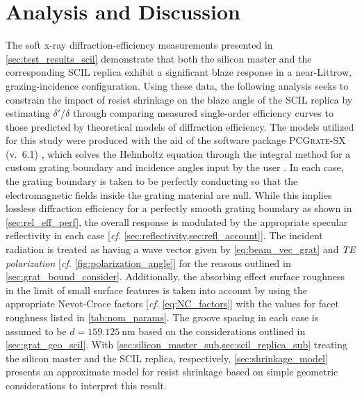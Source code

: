 \section{Analysis and Discussion}\label{sec:discussion_scil}
The soft x-ray diffraction-efficiency measurements presented in \cref{sec:test_results_scil} demonstrate that both the silicon master and the corresponding SCIL replica exhibit a significant blaze response in a near-Littrow, grazing-incidence configuration. 
Using these data, the following analysis seeks to constrain the impact of resist shrinkage on the blaze angle of the SCIL replica by estimating $\delta' / \delta$ through comparing measured single-order efficiency curves to those predicted by theoretical models of diffraction efficiency. 
The models utilized for this study were produced with the aid of the software package \textsc{PCGrate-SX} (v.\ 6.1) \cite{PCGrate_web}, which solves the Helmholtz equation through the integral method for a custom grating boundary and incidence angles input by the user \cite[\emph{cf.\@} \cref{sec:grat_bound_consider}]{Goray10}. 
In each case, the grating boundary is taken to be perfectly conducting so that the electromagnetic fields inside the grating material are null. 
While this implies lossless diffraction efficiency for a perfectly smooth grating boundary as shown in \cref{sec:rel_eff_perf}, the overall response is modulated by the appropriate specular reflectivity in each case [\emph{cf.\@} \cref{sec:reflectivity,sec:refl_account}]. 
The incident radiation is treated as having a wave vector given by \cref{eq:beam_vec_grat} and \emph{TE polarization} [\emph{cf.\@} \cref{fig:polarization_angle}] for the reasons outlined in \cref{sec:grat_bound_consider}.  
Additionally, the absorbing effect surface roughness in the limit of small surface features is taken into account by using the appropriate Nevot-Croce factors [\emph{cf.\@} \cref{eq:NC_factors}] with the values for facet roughness listed in \cref{tab:nom_params}.  
The groove spacing in each case is assumed to be $d = \SI{159.125}{\nm}$ based on the considerations outlined in \cref{sec:grat_geo_scil}.
With \cref{sec:silicon_master_sub,sec:scil_replica_sub} treating the silicon master and the SCIL replica, respectively, \cref{sec:shrinkage_model} presents an approximate model for resist shrinkage based on simple geometric considerations to interpret this result. 

